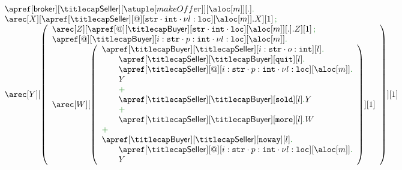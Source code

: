 
\begin{example}[Auction]
\[
  \begin{array}{l}
  \apref[\ptp {broker}][\amulti {Seller}][{\atuple[makeOffer]}][{\aloc[m]}][.] \mkop{.}
  \\  	
  \arec[X][{\apref[\amulti {Seller}][@][{{\asort[str]} \cdot {\asort[int]} \cdot {\nu l : \asort[loc]}}][{\aloc[m]}].X}][1] \seqop
  \\  	
  \arec[Y][{\left({
      	\begin{array}{l}
	\arec[Z][{\apref[@][\amulti {Buyer}][{{\asort[str]} \cdot {\asort[int]} \cdot {\asort[loc]}}][{\aloc[m]}][.].Z}][1] \seqop
	\\
	      \apref[@][\amulti {Buyer}][{{i : \asort[str]} \cdot {p : \asort[int]} \cdot {\nu l : \asort[loc]}}][{\aloc[m]}] \mkop{.}
	\\
	\arec[W][\left({
    	\begin{array}{l}
	\apref[\amulti {Buyer}][\amulti {Seller}][{i : \asort[{str}] \cdot {o : \asort[int]} }][{l}] \mkop{.}
	\\
	\qquad 
	\apref[\amulti {Seller}][\amulti {Buyer}][{\asort[quit]}][{l}] \mkop{.}
	\\
	\qquad 
	\apref[\amulti {Seller}][@][{{i : \asort[str]} \cdot {p : \asort[int]} \cdot {\nu l : \asort[loc]}}][{\aloc[m]}] \mkop{.}
	\\
	\qquad
	Y	
	\\
	\qquad
	\chop
	\\
	\qquad 
	\apref[\amulti {Seller}][\amulti {Buyer}][{\asort[sold]}][{l}]\mkop{.}
	Y	
	\\
	\qquad
	\chop
	\\
	\qquad
	\apref[\amulti {Seller}][\amulti {Buyer}][{\asort[more]}][{l}] \mkop{.} W
	\\
	\chop
	\\
        \apref[\amulti {Buyer}][\amulti {Seller}][{\asort[{noway}]}][{l}] \mkop{.}
        \\\qquad
        \apref[\amulti {Seller}][@][{{i : \asort[str]} \cdot {p : \asort[int]} \cdot {\nu l : \asort[loc]}}][{\aloc[m]}] \mkop{.}
          \\\qquad
          Y
	\end{array}
	}\right)][1]
     	\end{array}
  }\right)}][1]
  \end{array}
\]
\finex
\end{example}



